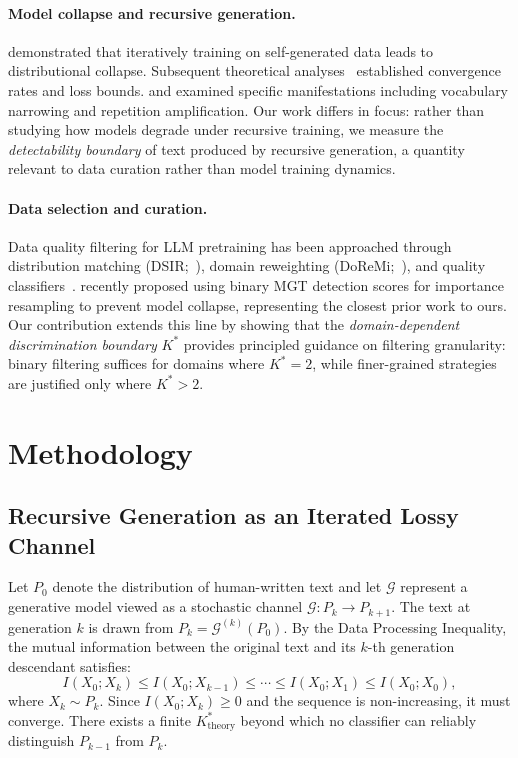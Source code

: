 \documentclass[11pt,a4paper]{article}
\begin{document}
\paragraph{Model collapse and recursive generation.}
\citet{shumailov2023curse} demonstrated that iteratively training on self-generated data leads to distributional collapse. Subsequent theoretical analyses~\citep{alemohammad2024selfconsuming,dohmatob2024tale,dohmatob2024strong} established convergence rates and loss bounds. \citet{guo2024curious} and \citet{briesch2023large} examined specific manifestations including vocabulary narrowing and repetition amplification. Our work differs in focus: rather than studying how models degrade under recursive training, we measure the \emph{detectability boundary} of text produced by recursive generation, a quantity relevant to data curation rather than model training dynamics.

\paragraph{Data selection and curation.}
Data quality filtering for LLM pretraining has been approached through distribution matching (DSIR;~\citealp{xie2023data}), domain reweighting (DoReMi;~\citealp{xie2024doremi}), and quality classifiers~\citep{penedo2023refinedweb,li2024datacomp}. \citet{drayson2025contamination} recently proposed using binary MGT detection scores for importance resampling to prevent model collapse, representing the closest prior work to ours. Our contribution extends this line by showing that the \emph{domain-dependent discrimination boundary} $K^*$ provides principled guidance on filtering granularity: binary filtering suffices for domains where $K^*\!=\!2$, while finer-grained strategies are justified only where $K^*\!>\!2$.


\section{Methodology}

\subsection{Recursive Generation as an Iterated Lossy Channel}
\label{sec:theory}

Let $P_0$ denote the distribution of human-written text and let $\mathcal{G}$ represent a generative model viewed as a stochastic channel $\mathcal{G}: P_k \to P_{k+1}$. The text at generation $k$ is drawn from $P_k = \mathcal{G}^{(k)}(P_0)$. By the Data Processing Inequality, the mutual information between the original text and its $k$-th generation descendant satisfies:
\begin{equation}
    I(X_0; X_k) \le I(X_0; X_{k-1}) \le \cdots \le I(X_0; X_1) \le I(X_0; X_0),
\end{equation}
where $X_k \sim P_k$. Since $I(X_0; X_k) \ge 0$ and the sequence is non-increasing, it must converge. There exists a finite $K^*_{\text{theory}}$ beyond which no classifier can reliably distinguish $P_{k-1}$ from $P_k$.
\end{document}
